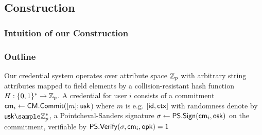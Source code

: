 






















\newpage
\subsection{Construction}\label{sec:mimcabc-construction}
\subsubsection{Intuition of our Construction}




\subsubsection{Outline}
Our credential system operates over attribute space $\mathbb{Z}_p$ with arbitrary string attributes mapped to field elements by a collision-resistant hash function $H: \{0,1\}^* \to \mathbb{Z}_p$. A credential for user $i$ consists of a 
commitment $\mathsf{cm}_i \gets \mathsf{CM.Commit}([m]; \mathsf{usk}$) where $m$ is e.g. $[\mathsf{id}, \mathsf{ctx}]$ with randomness denote by $\usk \sample \Z_p^*$, a Pointcheval-Sanders signature $\sigma \gets \mathsf{PS.Sign}(\mathsf{cm}_i, \mathsf{osk})$ on the commitment, verifiable by $\mathsf{PS.Verify}(\sigma, \mathsf{cm}_i, \mathsf{opk}) = 1$


